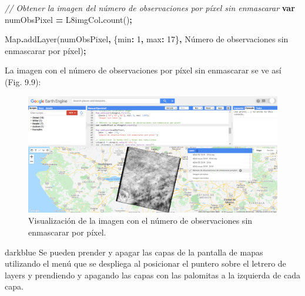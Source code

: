 \documentclass[
  12pt,
  letterpaper,
  twoside]{book}
\newenvironment{Shaded}{\begin{snugshade}}{\end{snugshade}}
\newcommand{\BuiltInTok}[1]{#1}
\newcommand{\CommentTok}[1]{\textcolor[rgb]{0.56,0.35,0.01}{\textit{#1}}}
\newcommand{\DataTypeTok}[1]{\textcolor[rgb]{0.13,0.29,0.53}{#1}}
\newcommand{\DecValTok}[1]{\textcolor[rgb]{0.00,0.00,0.81}{#1}}
\newcommand{\FunctionTok}[1]{\textcolor[rgb]{0.00,0.00,0.00}{#1}}
\newcommand{\KeywordTok}[1]{\textcolor[rgb]{0.13,0.29,0.53}{\textbf{#1}}}
\newcommand{\NormalTok}[1]{#1}
\newcommand{\OperatorTok}[1]{\textcolor[rgb]{0.81,0.36,0.00}{\textbf{#1}}}
\newcommand{\StringTok}[1]{\textcolor[rgb]{0.31,0.60,0.02}{#1}}
\begin{document}
\begin{Shaded}
\begin{Highlighting}[]
\CommentTok{// Obtener la imagen del número de observaciones por píxel sin enmascarar }
\KeywordTok{var}\NormalTok{ numObsPixel }\OperatorTok{=}\NormalTok{ L8imgCol}\OperatorTok{.}\FunctionTok{count}\NormalTok{()}\OperatorTok{;}

\BuiltInTok{Map}\OperatorTok{.}\FunctionTok{addLayer}\NormalTok{(numObsPixel}\OperatorTok{,}
\NormalTok{  \{}\DataTypeTok{min}\OperatorTok{:} \DecValTok{1}\OperatorTok{,} \DataTypeTok{max}\OperatorTok{:} \DecValTok{17}\NormalTok{\}}\OperatorTok{,}
  \StringTok{\textquotesingle{}Número de observaciones sin enmascarar por píxel\textquotesingle{}}\NormalTok{)}\OperatorTok{;}
\end{Highlighting}
\end{Shaded}

La imagen con el número de observaciones por píxel sin enmascarar se ve así (Fig. 9.9):

\begin{figure}[btp]

{\centering \includegraphics[width=1\linewidth]{Img/imCount} 

}

\caption{Visualización de la imagen con el número de observaciones sin enmascarar por píxel.}\label{fig:unnamed-chunk-163}
\end{figure}

\begin{bluebox2}

\begin{awesomeblock}{5pt}{\faLightbulb}{darkblue}
Se pueden prender y apagar las capas de la pantalla de mapas utilizando el menú que se despliega al posicionar el puntero sobre el letrero de layers y prendiendo y apagando las capas con las palomitas a la izquierda de cada capa.

\end{awesomeblock}

\end{bluebox2}
\end{document}
